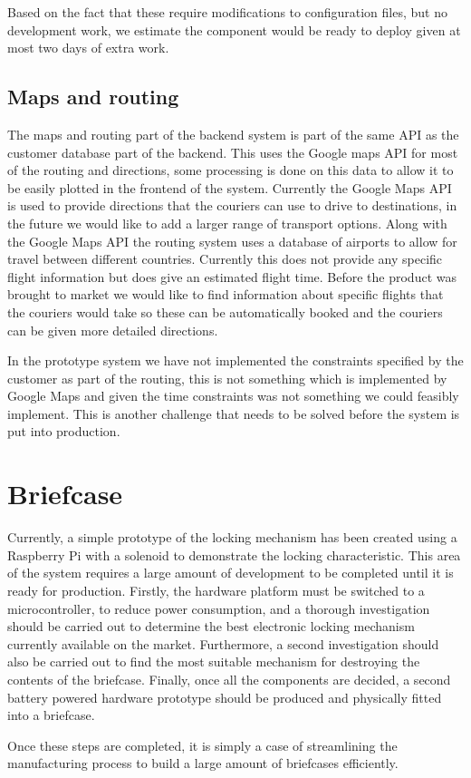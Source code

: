 Based on the fact that these require modifications to configuration files, but no development work, we estimate the component would be ready to deploy given at most two days of extra work.

\subsection{Maps and routing}

The maps and routing part of the backend system is part of the same API as the customer database part of the backend. This uses the Google maps API \cite{MapsAPI} for most of the routing and directions, some processing is done on this data to allow it to be easily plotted in the frontend of the system. Currently the Google Maps API is used to provide directions that the couriers can use to drive to destinations, in the future we would like to add a larger range of transport options. Along with the Google Maps API the routing system uses a database of airports \cite{AirpotFile} to allow for travel between different countries. Currently this does not provide any specific flight information but does give an estimated flight time. Before the product was brought to market we would like to find information about specific flights that the couriers would take so these can be automatically booked and the couriers can be given more detailed directions.

In the prototype system we have not implemented the constraints specified by the customer as part of the routing, this is not something which is implemented by Google Maps and given the time constraints was not something we could feasibly implement. This is another challenge that needs to be solved before the system is put into production.

\section{Briefcase}
Currently, a simple prototype of the locking mechanism has been created using a Raspberry Pi \cite{raspberryPi} with a solenoid to demonstrate the locking characteristic. This area of the system requires a large amount of development to be completed until it is ready for production. Firstly, the hardware platform must be switched to a microcontroller, to reduce power consumption, and a thorough investigation should be carried out to determine the best electronic locking mechanism currently available on the market. Furthermore, a second investigation should also be carried out to find the most suitable mechanism for destroying the contents of the briefcase. Finally, once all the components are decided, a second battery powered hardware prototype should be produced and physically fitted into a briefcase.

Once these steps are completed, it is simply a case of streamlining the manufacturing process to build a large amount of briefcases efficiently.